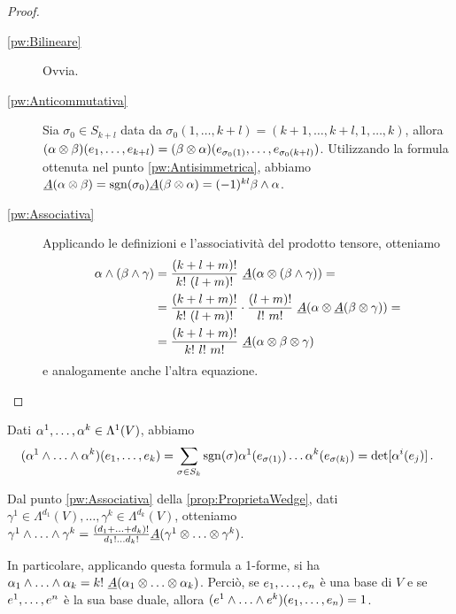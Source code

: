 \begin{proof}
\begin{description}
	\item [\ref{pw:Bilineare}] Ovvia.

	\item [\ref{pw:Anticommutativa}]
	Sia $\sigma_0\in S_{k+l}$ data da $\sigma_0(1,\ldots,k+l) = (k+1,\ldots,k+l,1,\ldots,k)$, allora $(\alpha\otimes \beta)(\seqb{e}{k+l}{,}) = (\beta\otimes \alpha)(e_{\sigma_0(1)},\ldots,e_{\sigma_0(k+l)})$.
	Utilizzando la formula ottenuta nel punto \ref{pw:Antisimmetrica}, abbiamo $\antisimm(\alpha\otimes\beta) = \sgn(\sigma_0) \antisimm(\beta\otimes\alpha)=(-1)^{kl} \beta \wedge \alpha$.

	\item [\ref{pw:Associativa}]
	Applicando le definizioni e l'associatività del prodotto tensore, otteniamo
	\begin{align*}
	\alpha\wedge(\beta\wedge\gamma) &= \frac{(k+l+m)!}{k!\ (l+m)!}\ \antisimm(\alpha\otimes(\beta\wedge\gamma)) =\\
	&=\frac{(k+l+m)!}{k!\ (l+m)!}\cdot \frac{(l+m)!}{l!\ m!}\ \antisimm(\alpha\otimes\antisimm(\beta\otimes\gamma))=\\
	&=\frac{(k+l+m)!}{k!\ l!\ m!}\ \antisimm(\alpha\otimes\beta\otimes\gamma)
	\end{align*}
	e analogamente anche l'altra equazione.

	\end{description}
\end{proof}


\begin{remark}
	Dati $\seqa{\alpha}{k}{,}\in\Lambda^1(V)$, abbiamo
	\begin{equation*}
		(\seqa{\alpha}{k}{\wedge})(\seqb{e}{k}{,}) = \sum_{\sigma\in S_k} \sgn(\sigma) \alpha^1(e_{\sigma(1)}) \ldots \alpha^k(e_{\sigma(k)}) = \det[\alpha^i(e_j)] \punto
	\end{equation*}
\end{remark}
\begin{remark}
	Dal punto \ref{pw:Associativa} della \cref{prop:ProprietaWedge}, dati $\gamma^1\in \Lambda^{d_1}(V),\ldots, \gamma^k\in \Lambda^{d_k}(V)$, otteniamo $\seqa{\gamma}{k}{\wedge} = \frac{(\seqb{d}{k}{+})!}{d_1!\ldots d_k!}\antisimm (\seqa{\gamma}{k}{\otimes})$.
	
	In particolare, applicando questa formula a 1-forme, si ha $\seqb{\alpha}{k}{\wedge} = k!\ \antisimm(\seqb{\alpha}{k}{\otimes})$.
	Perciò, se $\seqb en,$ è una base di $V$ e se $\seqa en,$ è la sua base duale, allora $(\seqa ek\wedge)(\seqb en,) = 1$.

\end{remark}

